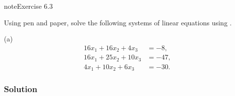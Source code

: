 \documentclass[letterpaper,10pt,english]{jupyterBook}
\begin{document}
\begin{sphinxadmonition}{note}{Exercise 6.3}

\sphinxAtStartPar
Using pen and paper, solve the following systems of linear equations using {\hyperref[\detokenize{6_Direct_methods/6.3_Cholesky_decomposition:cholesky-definition}]{}}.

\sphinxAtStartPar
(a)
\begin{align*}
    16x_1 +16x_2 +4x_3 &=-8,\\
    16x_1 +25x_2 +10x_3 &=-47,\\
    4x_1 +10x_2 +6x_3 &=-30.
\end{align*}\subsubsection*{Solution}


\end{sphinxadmonition}
\end{document}
